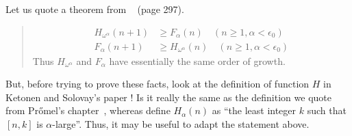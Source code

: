 \begin{exercise}
Let us quote a theorem from ~\cite{KS81} (page 297).

\begin{quote}
\begin{align*}
  H_{\omega^\alpha}(n+1) &\geq F_{\alpha}(n) \quad (n\geq 1, \alpha<\epsilon_0) \\
 F_{\alpha}(n+1) &\geq H_{\omega^\alpha}(n) \quad (n\geq 1, \alpha<\epsilon_0) 
\end{align*}
Thus $H_{\omega^\alpha}$ and $F_{\alpha}$ have essentially the same order of growth.

\end{quote}

 But, before trying to prove these facts, look at the definition of function $H$ in Ketonen and Solovay's paper ! Is it really the same as the definition we quote from Pr{\H o}mel's chapter~\cite{Promel2013},
whereas \cite{KS81} define $H_\alpha(n)$ as ``the least integer $k$ such that $[n,k]$ is $\alpha$-large''. Thus, it may be useful to adapt the statement above.



\end{exercise}













